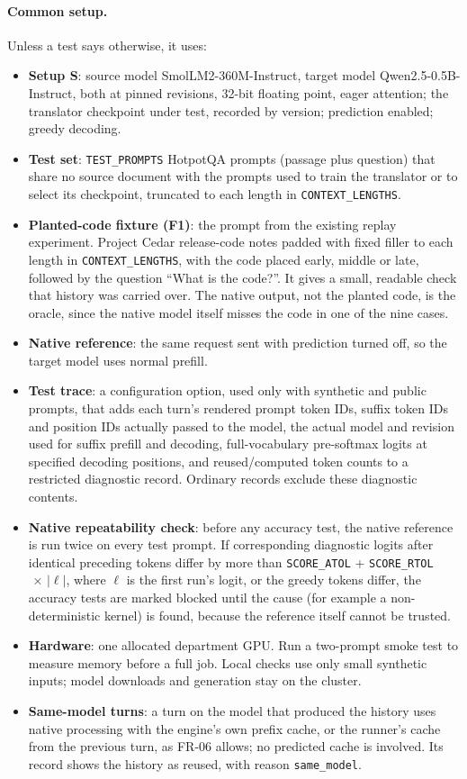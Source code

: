 \documentclass[12pt, titlepage]{article}
\newcommand{\cst}[1]{\texttt{#1}}
\begin{document}
\paragraph{Common setup.} Unless a test says otherwise, it uses:
\begin{itemize}
  \item \textbf{Setup S}: source model SmolLM2-360M-Instruct, target model
  Qwen2.5-0.5B-Instruct, both at pinned revisions, 32-bit floating point,
  eager attention; the translator checkpoint under test, recorded by version;
  prediction enabled; greedy decoding.
  \item \textbf{Test set}: \cst{TEST\_PROMPTS} HotpotQA prompts (passage
  plus question) that share no source document with the prompts used to
  train the translator or to select its checkpoint, truncated to each
  length in \cst{CONTEXT\_LENGTHS}.
  \item \textbf{Planted-code fixture (F1)}: the prompt from the existing
  replay experiment. Project Cedar release-code notes padded with fixed
  filler to each length in \cst{CONTEXT\_LENGTHS}, with the code placed
  early, middle or late, followed by the question ``What is the code?''. It
  gives a small, readable check that history was carried over. The native
  output, not the planted code, is the oracle, since the native model itself
  misses the code in one of the nine cases.
  \item \textbf{Native reference}: the same request sent with prediction
  turned off, so the target model uses normal prefill.
  \item \textbf{Test trace}: a configuration option, used only with
  synthetic and public prompts, that adds each turn's rendered prompt token
  IDs, suffix token IDs and position IDs actually passed to the model,
  the actual model and revision used for suffix prefill and decoding,
  full-vocabulary pre-softmax logits at specified decoding positions,
  and reused/computed token counts to a restricted diagnostic record.
  Ordinary records exclude these diagnostic contents.
  \item \textbf{Native repeatability check}: before any accuracy test, the
  native reference is run twice on every test prompt. If corresponding
  diagnostic logits after identical preceding tokens differ
  by more than \cst{SCORE\_ATOL} + \cst{SCORE\_RTOL}$\,\times\,\lvert\ell\rvert$,
  where $\ell$ is the first run's logit, or the
  greedy tokens differ, the accuracy tests are marked blocked until the
  cause (for example a non-deterministic kernel) is found, because the
  reference itself cannot be trusted.
  \item \textbf{Hardware}: one allocated department GPU. Run a two-prompt
  smoke test to measure memory before a full job. Local checks use only
  small synthetic inputs; model downloads and generation stay on the cluster.
  \item \textbf{Same-model turns}: a turn on the model that produced the
  history uses native processing with the engine's own prefix cache, or
  the runner's cache from the previous turn, as FR-06 allows; no predicted cache is involved. Its record shows the
  history as reused, with reason \texttt{same\_model}.
\end{itemize}
\end{document}

